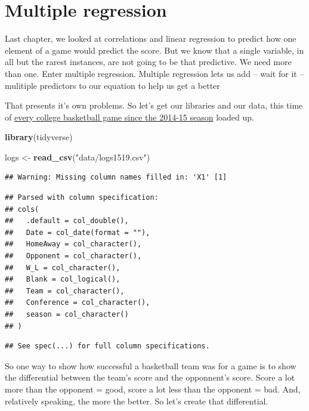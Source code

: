 \documentclass[]{book}
\newenvironment{Shaded}{\begin{snugshade}}{\end{snugshade}}
\newcommand{\KeywordTok}[1]{\textcolor[rgb]{0.13,0.29,0.53}{\textbf{#1}}}
\newcommand{\StringTok}[1]{\textcolor[rgb]{0.31,0.60,0.02}{#1}}
\newcommand{\NormalTok}[1]{#1}
\begin{document}
\chapter{Multiple regression}\label{multiple-regression}

Last chapter, we looked at correlations and linear regression to predict
how one element of a game would predict the score. But we know that a
single variable, in all but the rarest instances, are not going to be
that predictive. We need more than one. Enter multiple regression.
Multiple regression lets us add -- wait for it -- mulitiple predictors
to our equation to help us get a better

That presents it's own problems. So let's get our libraries and our
data, this time of
\href{https://unl.box.com/s/u9407jj007fxtnu1vbkybdawaqg6j3fw}{every
college basketball game since the 2014-15 season} loaded up.

\begin{Shaded}
\begin{Highlighting}[]
\KeywordTok{library}\NormalTok{(tidyverse)}
\end{Highlighting}
\end{Shaded}

\begin{Shaded}
\begin{Highlighting}[]
\NormalTok{logs <-}\StringTok{ }\KeywordTok{read_csv}\NormalTok{(}\StringTok{"data/logs1519.csv"}\NormalTok{)}
\end{Highlighting}
\end{Shaded}

\begin{verbatim}
## Warning: Missing column names filled in: 'X1' [1]
\end{verbatim}

\begin{verbatim}
## Parsed with column specification:
## cols(
##   .default = col_double(),
##   Date = col_date(format = ""),
##   HomeAway = col_character(),
##   Opponent = col_character(),
##   W_L = col_character(),
##   Blank = col_logical(),
##   Team = col_character(),
##   Conference = col_character(),
##   season = col_character()
## )
\end{verbatim}

\begin{verbatim}
## See spec(...) for full column specifications.
\end{verbatim}

So one way to show how successful a basketball team was for a game is to
show the differential between the team's score and the opponnent's
score. Score a lot more than the opponent = good, score a lot less than
the opponent = bad. And, relatively speaking, the more the better. So
let's create that differential.
\end{document}
